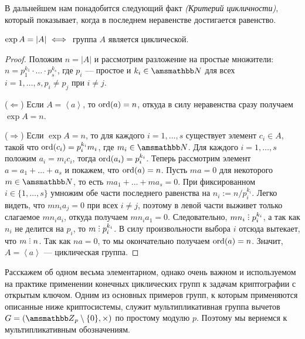 В дальнейшем нам понадобится следующий факт\textit{ (Критерий цикличности)},
который показывает, когда в последнем
неравенстве достигается равенство.

\begin{proposal}
    $\exp A = |A| \ \Longleftrightarrow \ $ группа $A$ является циклической.
\end{proposal}

\begin{proof}
    Положим $n = |A|$ и рассмотрим разложение на простые множители:
    $n = p_1^{k_1} \cdot \ldots \cdot p_s^{k_s}$, где $p_i$ ---
    простое и $k_i \in \NN$ для всех $i = 1, \ldots , s, p_i \ne p_j$
    при $i \ne j$.

    ($\Leftarrow$) Если $A = \left< a \right>$, то $\operatorname{ord}(a) = n$,
    откуда в силу неравенства сразу получаем $\exp A = n$.
    
    ($\Rightarrow$) Если $\exp A = n$, то для каждого $i = 1, \ldots , s$
    существует элемент $c_i \in A$, такой что $\operatorname{ord}(c_i) = p_i^{k_i}m_i$, где 
    $m_i \in \NN$. Для каждого $i = 1, \ldots , s$ положим $a_i = m_ic_i$,
    тогда $\operatorname{ord}(a_i) = p_i^{k_i}$. Теперь рассмотрим элемент
    $a = a_1 + \ldots + a_s$ и покажем, что $\operatorname{ord}(a) = n$.
    Пусть $ma = 0$ для некоторого $m \in \NN$, то есть 
    $ma_1 + \ldots + ma_s = 0$.
    При фиксированном $i \in \{1, \ldots , s\}$ умножим обе части последнего
    равенства на $n_i := n / p_i^{k_i}$. Легко видеть, что 
    $mn_ia_j = 0$ при всех $i \ne j$, поэтому в левой части выживет только
    слагаемое $mn_ia_i$, откуда получаем $mn_ia_1 = 0$. Следовательно, 
    $mn_i \divby p_i^{k_i}$, а так как $n_i$ не делится на $p_i$, то
    $m \divby p_i^{k_i}$. В силу произвольности выбора $i$ отсюда
    вытекает, что $m \divby n$. Так как $na = 0$, то мы окончательно получаем
    $\operatorname{ord}(a) = n$. Значит, $A = \left< a \right>$ --- циклическая группа.
\end{proof}


\newpage
\mysection
Расскажем об одном весьма элементарном, однако очень важном и
используемом на практике применении конечных циклических групп к
задачам криптографии с открытым ключом. Одним из основных
примеров групп, к которым применяются описанные ниже криптосистемы,
служит мультипликативная группа вычетов $G = (\ZZ_p \setminus \{0\}, \times)$
по простому модулю $p$. Поэтому мы вернемся к мультипликативным обозначениям.

